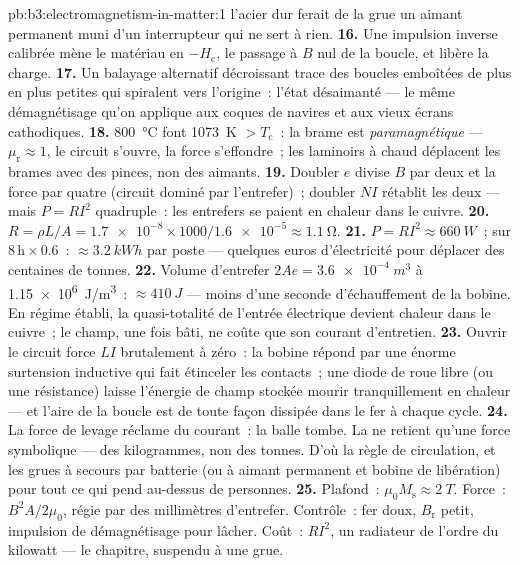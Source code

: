 \begin{solution}{pb:b3:electromagnetism-in-matter:1}
l'acier dur ferait de la grue un aimant permanent muni d'un
interrupteur qui ne sert à rien.
\textbf{16.} Une impulsion inverse calibrée mène le matériau en
$-H_{\text{c}}$, le passage à $B$ nul de la boucle, et libère la
charge.
\textbf{17.} Un balayage alternatif décroissant trace des boucles
emboîtées de plus en plus petites qui spiralent vers l'origine~:
l'état désaimanté --- le même démagnétisage qu'on applique aux
coques de navires et aux vieux écrans cathodiques.
\textbf{18.} \qty{800}{\celsius} font \qty{1073}{K} $> T_{\text{c}}$~:
la brame est \emph{paramagnétique} --- $\mu_{\text{r}} \approx 1$,
le circuit s'ouvre, la force s'effondre~; les laminoirs à chaud
déplacent les brames avec des pinces, non des aimants.
\textbf{19.} Doubler $e$ divise $B$ par deux et la force par quatre
(circuit dominé par l'entrefer)~; doubler $NI$ rétablit les deux ---
mais $P = RI^2$ quadruple~: les entrefers se paient en chaleur dans
le cuivre.
\textbf{20.} $R = \rho L/A = \num{1.7e-8}\times1000/
\num{1.6e-5} \approx \qty{1.1}{\ohm}$.
\textbf{21.} $P = RI^2 \approx \qty{660}{W}$~; sur
$8\,\text{h}\times0.6$~: $\approx\qty{3.2}{kWh}$ par poste ---
quelques euros d'électricité pour déplacer des centaines de tonnes.
\textbf{22.} Volume d'entrefer $2Ae = \qty{3.6e-4}{m^3}$ à
\qty{1.15e6}{J/m^3}~: $\approx\qty{410}{J}$ --- moins d'une seconde
d'échauffement de la bobine. En régime établi, la quasi-totalité de
l'entrée électrique devient chaleur dans le cuivre~; le champ, une
fois bâti, ne coûte que son courant d'entretien.
\textbf{23.} Ouvrir le circuit force $LI$ brutalement à zéro~: la
bobine répond par une énorme surtension inductive qui fait
étinceler les contacts~; une diode de roue libre (ou une résistance)
laisse l'énergie de champ stockée mourir tranquillement en chaleur
--- et l'aire de la boucle est de toute façon dissipée dans le fer à
chaque cycle.
\textbf{24.} La force de levage réclame du courant~: la balle tombe.
La  ne retient qu'une force symbolique --- des kilogrammes,
non des tonnes. D'où la règle de circulation, et les grues à secours
par batterie (ou à aimant permanent et bobine de libération) pour
tout ce qui pend au-dessus de personnes.
\textbf{25.} Plafond~: $\mu_0M_{\text{s}} \approx \qty{2}{T}$.
Force~: $B^2A/2\mu_0$, régie par des millimètres d'entrefer.
Contrôle~: fer doux, $B_{\text{r}}$ petit, impulsion de démagnétisage
pour lâcher. Coût~: $RI^2$, un radiateur de l'ordre du kilowatt ---
le chapitre, suspendu à une grue.
\end{solution}
